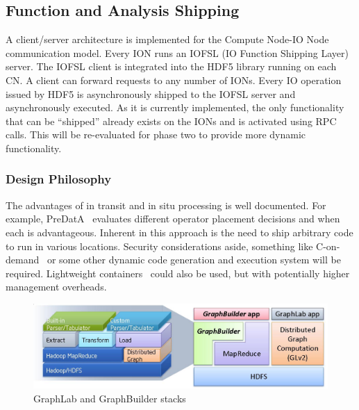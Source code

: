 \documentclass[conference]{IEEEtran} \pdfpagewidth=8.5in
\begin{document}
\subsection{Function and Analysis Shipping}
\label{sec:fn-shipping}

A client/server architecture is implemented for the Compute Node-IO Node
communication model.  Every ION runs an IOFSL (IO Function Shipping Layer)
server. The IOFSL client is integrated into the HDF5 library running on each
CN. A client can forward requests to any number of IONs. Every IO operation
issued by HDF5 is asynchronously shipped to the IOFSL server and asynchronously
executed. As it is currently implemented, the only functionality that can be
``shipped'' already exists on the IONs and is activated using RPC calls. This
will be re-evaluated for phase two to provide more dynamic functionality.

\subsubsection{Design Philosophy}

The advantages of in transit and in situ processing is well documented. For
example, PreDatA~\cite{zheng:2010:predata} evaluates different operator
placement decisions and when each is advantageous. Inherent in this approach is
the need to ship arbitrary code to run in various locations. Security
considerations aside, something like C-on-demand~\cite{abbasi:2011:c-on-demand}
or some other dynamic code generation and execution system will be required.
Lightweight containers~\cite{merkel:2014:docker} could also be used, but with
potentially higher management overheads.

\begin{figure}[htbp]
\centering
\includegraphics[width=\columnwidth]{images/graphlab-and-graphbuilder.png}
\caption{GraphLab and GraphBuilder stacks}
\label{fig:graphlab-graphbuilder}
\end{figure}
\end{document}
